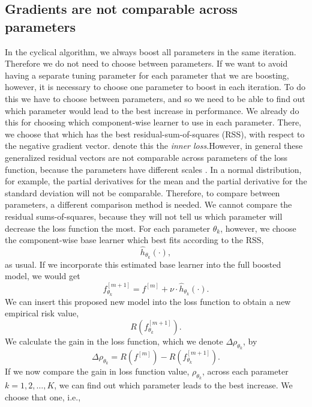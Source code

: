 \subsection{Gradients are not comparable across parameters}
In the cyclical algorithm, we always boost all parameters in the same iteration. Therefore we do not need to choose between parameters. If we want to avoid having a separate tuning parameter for each parameter that we are boosting, however, it is necessary to choose one parameter to boost in each iteration. To do this we have to choose between parameters, and so we need to be able to find out which parameter would lead to the best increase in performance. We already do this for choosing which component-wise learner to use in each parameter. There, we choose that which has the best residual-sum-of-squares (RSS), with respect to the negative gradient vector. \citet{thomas2018} denote this the \textit{inner loss}.However, in general these generalized residual vectors are not comparable across parameters of the loss function, because the parameters have different scales \citep{thomas2018}. In a normal distribution, for example, the partial derivatives for the mean and the partial derivative for the standard deviation will not be comparable. Therefore, to compare between parameters, a different comparison method is needed. We cannot compare the residual sums-of-squares, because they will not tell us which parameter will decrease the loss function the most. For each parameter $\theta_k$, however, we choose the component-wise base learner which best fits according to the RSS,
\begin{equation}
    \hat{h}_{\theta_k}(\cdot),
\end{equation}
as usual. If we incorporate this estimated base learner into the full boosted model, we would get
\begin{equation}
    f^{[m+1]}_{\theta_k}=f^{[m]}+\nu\cdot\hat{h}_{\theta_k}(\cdot).
\end{equation}
We can insert this proposed new model into the loss function to obtain a new empirical risk value,
\begin{equation}
    R(f^{[m+1]}_{\theta_k}).
\end{equation}
We calculate the gain in the loss function, which we denote $\Delta\rho_{\theta_k}$, by
\begin{equation}
    \Delta\rho_{\theta_k}=R(f^{[m]})-R(f^{[m+1]}_{\theta_k}).
\end{equation}
If we now compare the gain in loss function value, $\rho_{\theta_k}$, across each parameter $k=1,2,\ldots,K$, we can find out which parameter leads to the best increase. We choose that one, i.e.,
